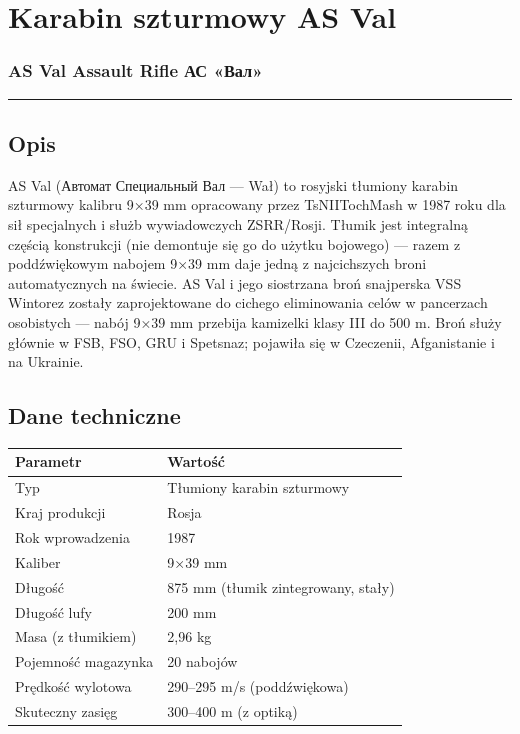 \documentclass[12pt,openany,oneside]{book}
\begin{document}
\chapter{Karabin szturmowy AS Val}\label{karabin-szturmowy-as-val}

\subsection{AS Val Assault Rifle \textbar{} АС
«Вал»}\label{as-val-assault-rifle-ux430ux441-ux432ux430ux43b}

\begin{center}\rule{0.5\linewidth}{0.5pt}\end{center}

\section{Opis}\label{opis-53}

AS Val (Автомат Специальный Вал --- Wał) to rosyjski tłumiony karabin
szturmowy kalibru 9×39 mm opracowany przez TsNIITochMash w 1987 roku dla
sił specjalnych i służb wywiadowczych ZSRR/Rosji. Tłumik jest integralną
częścią konstrukcji (nie demontuje się go do użytku bojowego) --- razem
z poddźwiękowym nabojem 9×39 mm daje jedną z najcichszych broni
automatycznych na świecie. AS Val i jego siostrzana broń snajperska VSS
Wintorez zostały zaprojektowane do cichego eliminowania celów w
pancerzach osobistych --- nabój 9×39 mm przebija kamizelki klasy III do
500 m. Broń służy głównie w FSB, FSO, GRU i Spetsnaz; pojawiła się w
Czeczenii, Afganistanie i na Ukrainie.

\section{Dane techniczne}\label{dane-techniczne-53}

\begin{longtable}[]{@{}ll@{}}
\toprule\noalign{}
Parametr & Wartość \\
\midrule\noalign{}
\endhead
\bottomrule\noalign{}
\endlastfoot
Typ & Tłumiony karabin szturmowy \\
Kraj produkcji & Rosja \\
Rok wprowadzenia & 1987 \\
Kaliber & 9×39 mm \\
Długość & 875 mm (tłumik zintegrowany, stały) \\
Długość lufy & 200 mm \\
Masa (z tłumikiem) & 2,96 kg \\
Pojemność magazynka & 20 nabojów \\
Prędkość wylotowa & 290--295 m/s (poddźwiękowa) \\
Skuteczny zasięg & 300--400 m (z optiką) \\
\end{longtable}
\end{document}
